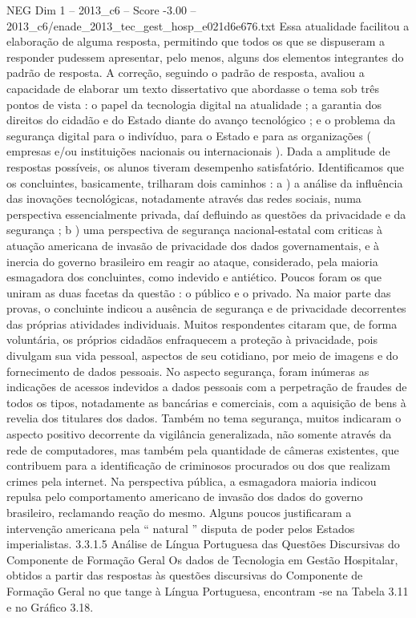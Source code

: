 \begin{textsample}{NEG Dim 1 – 2013\_c6 – Score -3.00 – 2013\_c6/enade\_2013\_tec\_gest\_hosp\_e021d6e676.txt}
Essa atualidade facilitou a elaboração de alguma resposta, permitindo que todos os que se dispuseram a responder pudessem apresentar, pelo menos, alguns dos elementos integrantes do padrão de resposta.
A correção, seguindo o padrão de resposta, avaliou a capacidade de elaborar um texto dissertativo que abordasse o tema sob três pontos de vista : o papel da tecnologia digital na atualidade ; a garantia dos direitos do cidadão e do Estado diante do avanço tecnológico ; e o problema da segurança digital para o indivíduo, para o Estado e para as organizações ( empresas e/ou instituições nacionais ou internacionais ).
Dada a amplitude de respostas possíveis, os alunos tiveram desempenho satisfatório.
Identificamos que os concluintes, basicamente, trilharam dois caminhos : a ) a análise da influência das inovações tecnológicas, notadamente através das redes sociais, numa perspectiva essencialmente privada, daí defluindo as questões da privacidade e da segurança ; b ) uma perspectiva de segurança nacional-estatal com criticas à atuação americana de invasão de privacidade dos dados governamentais, e à inercia do governo brasileiro em reagir ao ataque, considerado, pela maioria esmagadora dos concluintes, como indevido e antiético.
Poucos foram os que uniram as duas facetas da questão : o público e o privado.
Na maior parte das provas, o concluinte indicou a ausência de segurança e de privacidade decorrentes das próprias atividades individuais.
Muitos respondentes citaram que, de forma voluntária, os próprios cidadãos enfraquecem a proteção à privacidade, pois divulgam sua vida pessoal, aspectos de seu cotidiano, por meio de imagens e do fornecimento de dados pessoais.
No aspecto segurança, foram inúmeras as indicações de acessos indevidos a dados pessoais com a perpetração de fraudes de todos os tipos, notadamente as bancárias e comerciais, com a aquisição de bens à revelia dos titulares dos dados.
Também no tema segurança, muitos indicaram o aspecto positivo decorrente da vigilância generalizada, não somente através da rede de computadores, mas também pela quantidade de câmeras existentes, que contribuem para a identificação de criminosos procurados ou dos que realizam crimes pela internet.
Na perspectiva pública, a esmagadora maioria indicou repulsa pelo comportamento americano de invasão dos dados do governo brasileiro, reclamando reação do mesmo.
Alguns poucos justificaram a intervenção americana pela “ natural ” disputa de poder pelos Estados imperialistas. 3.3.1.5 Análise de Língua Portuguesa das Questões Discursivas do Componente de Formação Geral Os dados de Tecnologia em Gestão Hospitalar, obtidos a partir das respostas às questões discursivas do Componente de Formação Geral no que tange à Língua Portuguesa, encontram -se na Tabela 3.11 e no Gráfico 3.18.

\end{textsample}
